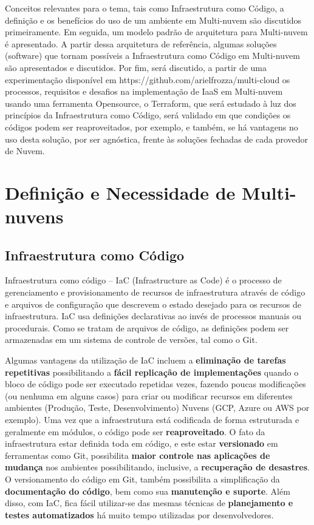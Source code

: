 \documentclass[12pt]{article}
\begin{document}
	    Conceitos relevantes para o tema, tais como Infraestrutura como Código, a definição e os benefícios do uso de um ambiente em Multi-nuvem são discutidos primeiramente. Em seguida, um modelo padrão de arquitetura para Multi-nuvem é apresentado. A partir dessa arquitetura de referência, algumas soluções (software) que tornam possíveis a Infraestrutura como Código em Multi-nuvem são apresentados e discutidos. Por fim, será discutido, a partir de uma experimentação disponível em https://github.com/arielfrozza/multi-cloud os processos, requisitos e desafios na implementação de IaaS em Multi-nuvem usando uma ferramenta Opensource, o Terraform, que será estudado à luz dos princípios da Infraestrutura como Código, será validado em que condições os códigos podem ser reaproveitados, por exemplo, e também, se há vantagens no uso desta solução, por ser agnóstica, frente às soluções fechadas de cada provedor de Nuvem.
		
	\section{Definição e Necessidade de Multi-nuvens}
	
		\subsection{Infraestrutura como Código}
	
	Infraestrutura como código – IaC (Infrastructure as Code) é o processo de gerenciamento e provisionamento de recursos de infraestrutura através de código e arquivos de configuração que descrevem o estado desejado para os recursos de infraestrutura. IaC usa definições declarativas ao invés de processos manuais ou procedurais. Como se tratam de arquivos de código, as definições podem ser armazenadas em um sistema de controle de versões, tal como o Git.
	
	Algumas vantagens da utilização de IaC incluem a \textbf{eliminação de tarefas repetitivas} possibilitando a  \textbf{fácil replicação de implementações} quando o bloco de código pode ser executado repetidas vezes, fazendo poucas modificações (ou nenhuma em alguns casos) para criar ou modificar recursos em diferentes ambientes (Produção, Teste, Desenvolvimento) Nuvens (GCP, Azure ou AWS por exemplo). Uma vez que a infraestrutura  está codificada de forma estruturada e geralmente em módulos, o código pode ser \textbf{reaproveitado}. O fato da infraestrutura estar definida toda em código, e este estar \textbf{versionado} em ferramentas como Git, possibilita \textbf{maior controle nas aplicações de mudança} nos ambientes possibilitando, inclusive, a \textbf{recuperação de desastres}. O versionamento do código em Git, também possibilita a simplificação da \textbf{documentação do código}, bem como sua \textbf{manutenção e suporte}. Além disso, com IaC, fica fácil utilizar-se das mesmas técnicas de \textbf{planejamento e testes automatizados} há muito tempo utilizadas por desenvolvedores.	
	
\end{document}
